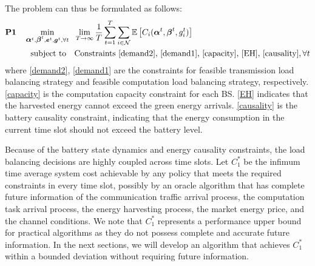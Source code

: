 \documentclass[12pt, draftclsnofoot, letterpaper, onecolumn]{IEEEtran}
\begin{document}
The problem can thus be formulated as follows:
\begin{subequations}
	\begin{align}
	\textbf{P1}~~~\min_{{\small\bm{\alpha}^t, \bm{\beta}^t}, \e^t, \g^t, \forall t}~~&\lim_{T\to\infty}\frac{1}{T}\sum_{t=1}^T\sum_{i\in\mathcal{N}} \mathbb{E}\left[C_i(\bm\alpha^t, \bm\beta^t, g^t_i)\right]\\
	\text{subject to}~~~ %
	&\text{Constraints \eqref{demand2},  \eqref{demand1}, \eqref{capacity}, \eqref{EH}, \eqref{causality}}, \forall t \nonumber
	\end{align}
\end{subequations}
where \eqref{demand2}, \eqref{demand1} are the constraints for feasible transmission load balancing strategy and feasible computation load balancing strategy, respectively. \eqref{capacity} is the computation capacity constraint for each BS. \eqref{EH} indicates that the harvested energy cannot exceed the green energy arrivals. \eqref{causality} is the battery causality constraint, indicating that the energy consumption in the current time slot should not exceed the battery level.

Because of the battery state dynamics and energy causality constraints, the load balancing decisions are highly coupled across time slots. Let $C^*_1$ be the infimum time average system cost achievable by any policy that meets the required constraints in every time slot, possibly by an oracle algorithm that has complete future information of the communication traffic arrival process, the computation task arrival process, the energy harvesting process, the market energy price, and the channel conditions. We note that $C^*_1$ represents a performance upper bound for practical algorithms as they do not possess complete and accurate future information. In the next sections, we will develop an algorithm that achieves $C^*_1$ within a bounded deviation without requiring future information.
\end{document}
